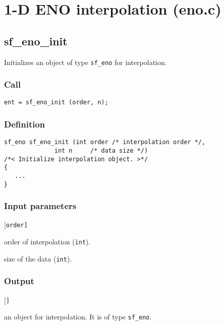 \section{1-D ENO interpolation (eno.c)}\label{sec:eno.c}




\subsection{{sf\_eno\_init}}\label{sec:sf_eno_init}
Initializes an object of type \texttt{sf\_eno} for interpolation.

\subsubsection*{Call}
\begin{verbatim}ent = sf_eno_init (order, n);\end{verbatim}

\subsubsection*{Definition}
\begin{verbatim}
sf_eno sf_eno_init (int order /* interpolation order */, 
              int n     /* data size */)
/*< Initialize interpolation object. >*/
{
   ...
}
\end{verbatim}

\subsubsection*{Input parameters}
\begin{desclist}{\tt }{\quad}[\tt order]
   \setlength\itemsep{0pt}
   \item[order] order of interpolation (\texttt{int}).  
   \item[n]     size of the data (\texttt{int}).  
\end{desclist}

\subsubsection*{Output}
\begin{desclist}{\tt }{\quad}[\tt ]
   \setlength\itemsep{0pt}  
   \item[ent] an object for interpolation. It is of type \texttt{sf\_eno}.
\end{desclist}




